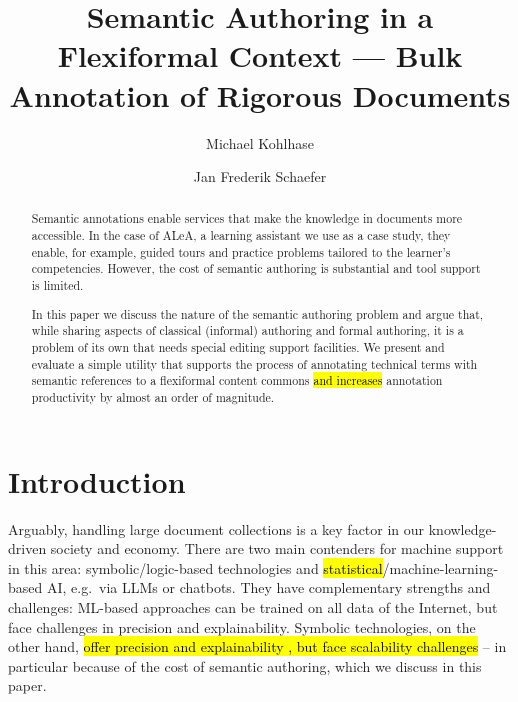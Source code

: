 \documentclass[runningheads]{llncs}
\title{
        Semantic Authoring in a Flexiformal Context --- Bulk Annotation of Rigorous Documents
}
\author{Michael Kohlhase\orcidlink{0000-0002-9859-6337} \and Jan Frederik Schaefer\orcidlink{0000-0003-2545-4626}}
\institute{Computer Science, FAU Erlangen N\"urnberg, Germany}
\def\edited#1{\hl{#1}}
\newcommand\ALeA{\textsf{ALeA}\xspace}
\begin{document}
\maketitle
\begin{abstract}
% 

  Semantic annotations enable services that make the knowledge in documents more
  accessible.  In the case of \ALeA, a learning assistant we use as a case study, they
  enable, for example, guided tours and practice problems tailored to the learner's
  competencies.  However, the cost of semantic authoring is substantial and tool support
  is limited.

  In this paper we discuss the nature of the semantic authoring problem and argue that,
  while sharing aspects of classical (informal) authoring and formal authoring, it is a
  problem of its own that needs special editing support facilities.  We present and
  evaluate a simple utility that supports the process of annotating technical terms with
    semantic references to a flexiformal content commons \edited{and increases} annotation
  productivity by almost an order of magnitude.
\end{abstract}

\section{Introduction}
Arguably, handling large document collections is a key factor in our knowledge-driven society and economy.
There are two main contenders for machine support in this area:
symbolic/logic-based technologies and \edited{statistical}/machine-learning-based AI, e.g.\ via LLMs or chatbots.
They have complementary strengths and challenges:
ML-based approaches can be trained on all data of the Internet, but face challenges in precision and explainability. 
Symbolic technologies, on the other hand, \edited{offer precision and explainability%
, but face scalability challenges}
-- in particular because of the cost of semantic authoring, which we discuss in this paper.
\end{document}
